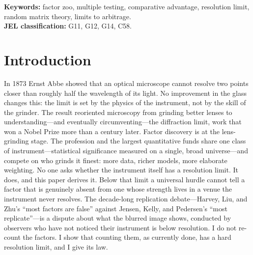 \documentclass[12pt]{article}
\theoremstyle{plain}
\theoremstyle{definition}
\begin{document}
\begin{abstract}
paradigms, and every venue axis I try---the common tilt is recoverable as a
pooled mean, while every residual axis sits below a Baik--Ben~Arous--P\'ech\'e
detection threshold and is noise out of sample. The economics are therefore two-sided: reallocating discarded factors as
a group pays with no forecasting, while per-factor routing and volatility-tilted
weighting are, respectively, a selection-bias illusion and a relabeled
low-volatility anomaly. Each negative result is a measurement of where the resolution limit
sits, not a failure to reach past it. The welfare cost grows with the zoo: a
universal hurdle scales as $\sqrt{2\log N}$ in the candidate count, but a
large-language-model factory emits $N$ factors spanning an effective dimension
$d_{\mathrm{eff}}\ll N$---in a real $6{,}960$-factor pool, $d_{\mathrm{eff}}=17$
and the hurdle discards $94\%$---so the honest threshold is $\sqrt{2\log
d_{\mathrm{eff}}}$ and the band of wrongly discarded strength widens as the
factory scales. The replication crisis is not a crisis of factors. It is a
crisis of measurement.
\end{abstract}

\medskip
\noindent\textbf{Keywords:} factor zoo, multiple testing, comparative advantage,
resolution limit, random matrix theory, limits to arbitrage.\\
\noindent\textbf{JEL classification:} G11, G12, G14, C58.

\clearpage
\setcounter{page}{1}

\section*{Introduction}

In 1873 Ernst Abbe showed that an optical microscope cannot resolve two points
closer than roughly half the wavelength of its light. No improvement in the
glass changes this: the limit is set by the physics of the instrument, not by
the skill of the grinder. The result reoriented microscopy from grinding better
lenses to understanding---and eventually circumventing---the diffraction limit,
work that won a Nobel Prize more than a century later. Factor discovery is at
the lens-grinding stage. The profession and the largest quantitative funds share
one class of instrument---statistical significance measured on a single, broad
universe---and compete on who grinds it finest: more data, richer models, more
elaborate weighting. No one asks whether the instrument itself has a resolution
limit. It does, and this paper derives it. Below that limit a universal hurdle
cannot tell a factor that is genuinely absent from one whose strength lives in a
venue the instrument never resolves. The decade-long replication debate---Harvey,
Liu, and Zhu's ``most factors are false'' against Jensen, Kelly, and Pedersen's
``most replicate''---is a dispute about what the blurred image shows, conducted
by observers who have not noticed their instrument is below resolution. I do not
re-count the factors. I show that counting them, as currently done, has a hard
resolution limit, and I give its law.
\end{document}
